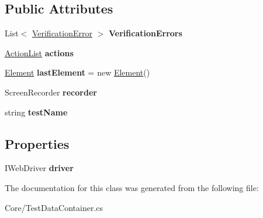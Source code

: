 \subsection*{Public Attributes}
\begin{DoxyCompactItemize}
\item 
\hypertarget{class_proto_test_1_1_golem_1_1_core_1_1_test_data_container_a25559eebe742f6cb4201e219774bb150}{List$<$ \hyperlink{class_proto_test_1_1_golem_1_1_web_driver_1_1_verification_error}{Verification\-Error} $>$ {\bfseries Verification\-Errors}}\label{class_proto_test_1_1_golem_1_1_core_1_1_test_data_container_a25559eebe742f6cb4201e219774bb150}

\item 
\hypertarget{class_proto_test_1_1_golem_1_1_core_1_1_test_data_container_aa67bb772b7abe9207e0f3f75c5450454}{\hyperlink{class_proto_test_1_1_golem_1_1_core_1_1_action_list}{Action\-List} {\bfseries actions}}\label{class_proto_test_1_1_golem_1_1_core_1_1_test_data_container_aa67bb772b7abe9207e0f3f75c5450454}

\item 
\hypertarget{class_proto_test_1_1_golem_1_1_core_1_1_test_data_container_a168383b75ee67b531f1626b7cfe4184f}{\hyperlink{class_proto_test_1_1_golem_1_1_web_driver_1_1_element}{Element} {\bfseries last\-Element} = new \hyperlink{class_proto_test_1_1_golem_1_1_web_driver_1_1_element}{Element}()}\label{class_proto_test_1_1_golem_1_1_core_1_1_test_data_container_a168383b75ee67b531f1626b7cfe4184f}

\item 
\hypertarget{class_proto_test_1_1_golem_1_1_core_1_1_test_data_container_a9d99b027094f98398a19983b3e01d80b}{Screen\-Recorder {\bfseries recorder}}\label{class_proto_test_1_1_golem_1_1_core_1_1_test_data_container_a9d99b027094f98398a19983b3e01d80b}

\item 
\hypertarget{class_proto_test_1_1_golem_1_1_core_1_1_test_data_container_a9aa79b85e4a4382ed6e294282773ae83}{string {\bfseries test\-Name}}\label{class_proto_test_1_1_golem_1_1_core_1_1_test_data_container_a9aa79b85e4a4382ed6e294282773ae83}

\end{DoxyCompactItemize}
\subsection*{Properties}
\begin{DoxyCompactItemize}
\item 
\hypertarget{class_proto_test_1_1_golem_1_1_core_1_1_test_data_container_a1273aa8f35f0c75b0cedc68be9f68e7d}{I\-Web\-Driver {\bfseries driver}}\label{class_proto_test_1_1_golem_1_1_core_1_1_test_data_container_a1273aa8f35f0c75b0cedc68be9f68e7d}

\end{DoxyCompactItemize}


The documentation for this class was generated from the following file\-:\begin{DoxyCompactItemize}
\item 
Core/Test\-Data\-Container.\-cs\end{DoxyCompactItemize}
